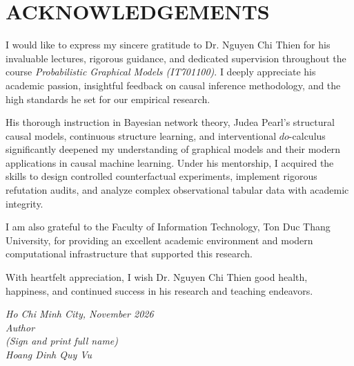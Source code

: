 \chapter*{ACKNOWLEDGEMENTS}
I would like to express my sincere gratitude to Dr. Nguyen Chi Thien for his invaluable lectures, rigorous guidance, and dedicated supervision throughout the course \emph{Probabilistic Graphical Models (IT701100)}. I deeply appreciate his academic passion, insightful feedback on causal inference methodology, and the high standards he set for our empirical research.

His thorough instruction in Bayesian network theory, Judea Pearl's structural causal models, continuous structure learning, and interventional $do$-calculus significantly deepened my understanding of graphical models and their modern applications in causal machine learning. Under his mentorship, I acquired the skills to design controlled counterfactual experiments, implement rigorous refutation audits, and analyze complex observational tabular data with academic integrity.

I am also grateful to the Faculty of Information Technology, Ton Duc Thang University, for providing an excellent academic environment and modern computational infrastructure that supported this research.

With heartfelt appreciation, I wish Dr. Nguyen Chi Thien good health, happiness, and continued success in his research and teaching endeavors.

\vspace*{1cm}
\begin{flushright}
	\begin{minipage}{8.75cm}
		\centering\itshape
		Ho Chi Minh City, November 2026\\
		Author\\[2.5cm]
		(Sign and print full name)\\
		Hoang Dinh Quy Vu
	\end{minipage}
\end{flushright}
\newpage
